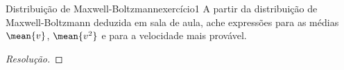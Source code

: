 \begin{exercício}{Distribuição de Maxwell-Boltzmann}{exercício1}
    A partir da distribuição de Maxwell-Boltzmann deduzida em sala de aula, ache expressões para as médias \(\mean{v}\), \(\mean{v^2}\) e para a velocidade mais provável.
\end{exercício}
\begin{proof}[Resolução]

\end{proof}
